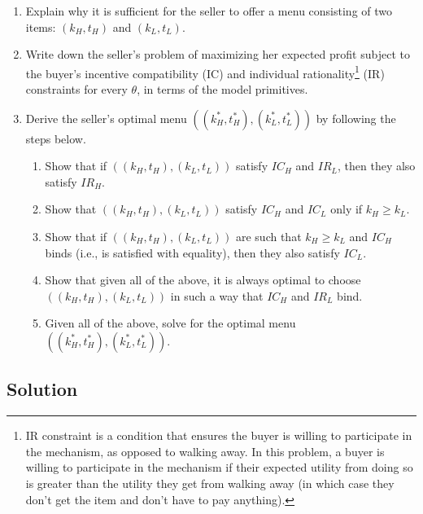 \documentclass[a4paper]{article}
\newif\ifsolutions
\begin{document}
\begin{enumerate}
	\item Explain why it is sufficient for the seller to offer a menu consisting of two items: $(k_H,t_H)$ and $(k_L,t_L)$.
	
	\item Write down the seller's problem of maximizing her expected profit subject to the buyer's incentive compatibility (IC) and individual rationality\footnote{IR constraint is a condition that ensures the buyer is willing to participate in the mechanism, as opposed to walking away. In this problem, a buyer is willing to participate in the mechanism if their expected utility from doing so is greater than the utility they get from walking away (in which case they don't get the item and don't have to pay anything).} (IR) constraints for every $\theta$, in terms of the model primitives.
	
	\item Derive the seller's optimal menu $((k_H^*,t_H^*), (k_L^*,t_L^*))$ by following the steps below.
	\begin{enumerate}
		\item Show that if $((k_H,t_H),(k_L,t_L))$ satisfy $IC_H$ and $IR_L$, then they also satisfy $IR_H$.
		\item Show that $((k_H,t_H),(k_L,t_L))$ satisfy $IC_H$ and $IC_L$ only if $k_H \geq k_L$.
		\item Show that if $((k_H,t_H),(k_L,t_L))$ are such that $k_H \geq k_L$ and $IC_H$ binds (i.e., is satisfied with equality), then they also satisfy $IC_L$.
		\item Show that given all of the above, it is always optimal to choose  $((k_H,t_H),(k_L,t_L))$ in such a way that $IC_H$ and $IR_L$ bind.
		\item Given all of the above, solve for the optimal menu $((k_H^*,t_H^*), (k_L^*,t_L^*))$.
	\end{enumerate}
\end{enumerate}

\ifsolutions
\subsection*{Solution}
\end{document}
